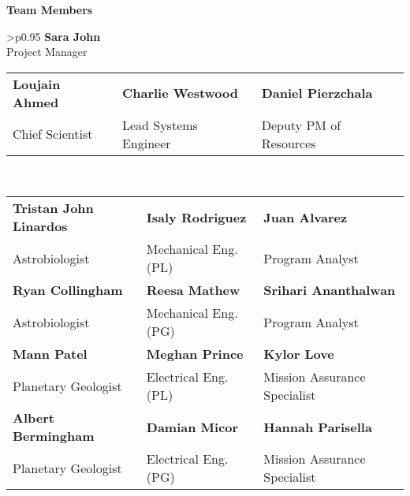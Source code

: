 \vspace{2em}

\noindent
\begin{center}
\begin{minipage}{\textwidth}
\centering

\vspace{1em}
\textbf{\Large Team Members}

\vspace{2em}

\begin{tabular}{>{\centering\arraybackslash}p{}}
\textbf{Sara John} \\ 
\small Project Manager \\
\begin{tabular}{>{\centering\arraybackslash}p{} >{\centering\arraybackslash}p{} >{\centering\arraybackslash}p{}}
\textbf{Loujain Ahmed} & \textbf{Charlie Westwood} & \textbf{Daniel Pierzchala} \\
\small Chief Scientist & \small Lead Systems Engineer & \small Deputy PM of Resources \\
\end{tabular} \\[1em]
\begin{tabular}{>{\centering\arraybackslash}p{} >{\centering\arraybackslash}p{} >{\centering\arraybackslash}p{}}

\textbf{Tristan John Linardos} & \textbf{Isaly Rodriguez} & \textbf{Juan Alvarez} \\
\small Astrobiologist & \small Mechanical Eng. (PL) & \small Program Analyst \\

\textbf{Ryan Collingham} & \textbf{Reesa Mathew} & \textbf{Srihari Ananthalwan} \\
\small Astrobiologist & \small Mechanical Eng. (PG) & \small Program Analyst \\

\textbf{Mann Patel} & \textbf{Meghan Prince} & \textbf{Kylor Love} \\
\small Planetary Geologist & \small Electrical Eng. (PL) & \small Mission Assurance Specialist \\

\textbf{Albert Bermingham} & \textbf{Damian Micor} & \textbf{Hannah Parisella} \\
\small Planetary Geologist & \small Electrical Eng. (PG) & \small Mission Assurance Specialist \\


\end{tabular}
\end{tabular}
\end{minipage}
\end{center}
